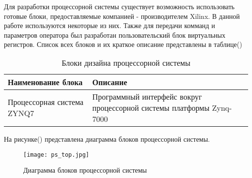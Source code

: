 Для разработки процессорной системы существует возможность использовать готовые блоки, предоставляемые компанией - производителем Xilinx. В данной работе используются некоторые из них. Также для передачи комманд и параметров оператора был разработан пользовательский блок виртуальных регистров. Список всех блоков и их краткое описание представлены в таблице()\par
\begin{table}
    \caption{Блоки дизайна процессорной системы}
    \begin{tabular}{|>{\centering\arraybackslash}p{}|>{\centering\arraybackslash}p{}|}
        \hline
        Наименование блока & Описание \\
        \hline
        Процессорная система ZYNQ7 & Программный интерфейс вокруг процессорной системы платформы Zynq-7000 \\
        \hline
    \end{tabular}
\end{table}
На рисунке() представлена диаграмма блоков процессорной системы.\par
\begin{figure}[ht]
    \centering
    \texttt{[image: ps\_top.jpg]}
    \caption{Диаграмма блоков процессорной системы}
    \label{fig:mpr}
\end{figure}
